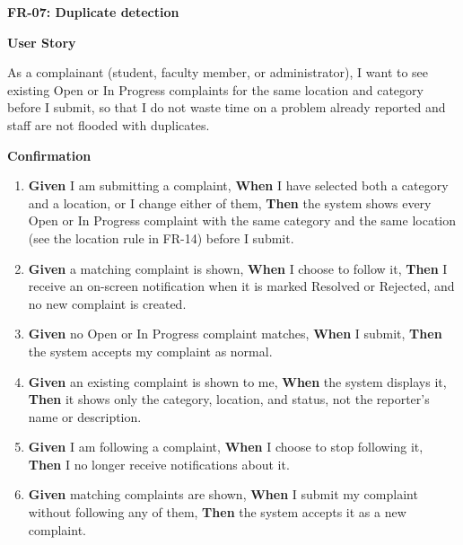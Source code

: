 \noindent\textbf{FR-07: Duplicate detection}\par\nopagebreak[4]\smallskip
\noindent\textbf{User Story}\par\nopagebreak[4]
\noindent As a complainant (student, faculty member, or administrator), I want to see existing Open or In Progress complaints for the same location and category before I submit, so that I do not waste time on a problem already reported and staff are not flooded with duplicates.\par\smallskip
{\makeatletter
{}
\makeatother
\noindent\textbf{Confirmation}\par\nopagebreak[4]\vspace{-6pt}\nopagebreak[4]
\begin{enumerate}\setlength{\itemsep}{2pt}\setlength{\parsep}{0pt}\setlength{\topsep}{2pt}\setlength{\partopsep}{0pt}
  \item \textbf{Given} I am submitting a complaint, \textbf{When} I have selected both a category and a location, or I change either of them, \textbf{Then} the system shows every Open or In Progress complaint with the same category and the same location (see the location rule in FR-14) before I submit.
  \item \textbf{Given} a matching complaint is shown, \textbf{When} I choose to follow it, \textbf{Then} I receive an on-screen notification when it is marked Resolved or Rejected, and no new complaint is created.
  \item \textbf{Given} no Open or In Progress complaint matches, \textbf{When} I submit, \textbf{Then} the system accepts my complaint as normal.
  \item \textbf{Given} an existing complaint is shown to me, \textbf{When} the system displays it, \textbf{Then} it shows only the category, location, and status, not the reporter's name or description.
  \item \textbf{Given} I am following a complaint, \textbf{When} I choose to stop following it, \textbf{Then} I no longer receive notifications about it.
  \item \textbf{Given} matching complaints are shown, \textbf{When} I submit my complaint without following any of them, \textbf{Then} the system accepts it as a new complaint.
\end{enumerate}}
\medskip
 
